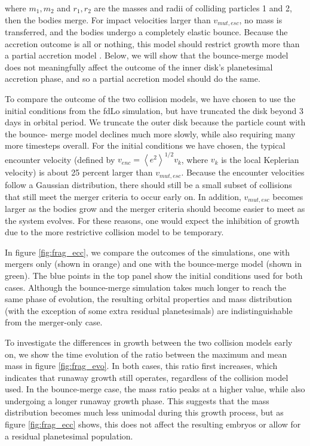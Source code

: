 \documentclass[twocolumn]{aastex63}
\begin{document}
where $m_{1}, m_{2}$ and $r_{1}, r_{2}$ are the masses and radii of
colliding particles 1 and 2, then the bodies merge. For
impact velocities larger than $v_{mut, esc}$, no mass is transferred, and the bodies undergo a completely elastic bounce. 
Because the accretion outcome is all or nothing, this model should restrict growth more than a partial accretion model 
\citep{leinhardt12}. Below, we will show that the bounce-merge model does not meaningfully affect the outcome of the inner 
disk's planetesimal accretion phase, and so a partial accretion model should do the same.

To compare the outcome of the two collision models, we have chosen to use the initial conditions from the fdLo simulation, but 
have truncated the disk beyond 3 days in orbital period. We truncate the outer disk because the particle count with the bounce-
merge model declines much more slowly, while also requiring many more timesteps overall.
For the initial conditions we have chosen, the typical encounter velocity (defined by $v_{enc} = \left< e^{2} \right>^{1/2} v_{k}$, 
where $v_{k}$ is the local Keplerian velocity) is about 25 percent larger than $v_{mut, esc}$. Because the encounter velocities 
follow a Gaussian distribution, there should still be a small subset of collisions that still meet the merger criteria to occur early on. 
In addition, $v_{mut, esc}$ becomes larger as the bodies grow and the merger criteria should become easier to meet as the 
system evolves. For these reasons, one would expect the inhibition of growth due to the more restrictive collision model to be 
temporary.

In figure \ref{fig:frag_ecc}, we compare the outcomes of the simulations, one with mergers only (shown in orange) and one with 
the bounce-merge model (shown in green). The blue points in the top panel show the initial conditions used for both cases. 
Although the bounce-merge simulation takes much longer to reach the same phase of evolution, the resulting orbital properties 
and mass distribution (with the exception of some extra residual planetesimals) are indistinguishable from the merger-only case.

To investigate the differences in growth between the two collision models early on, we show the time evolution of the ratio 
between the maximum and mean mass in figure \ref{fig:frag_evo}. In both cases, this ratio first increases, which indicates that 
runaway growth still operates, regardless of the collision model used. In the bounce-merge case, the mass ratio peaks at a 
higher value, while also undergoing a longer runaway growth phase. This suggests that the mass distribution becomes much 
less unimodal during this growth process, but as figure \ref{fig:frag_ecc} shows, this does not affect the resulting embryos or 
allow for a residual planetesimal population.
\end{document}

